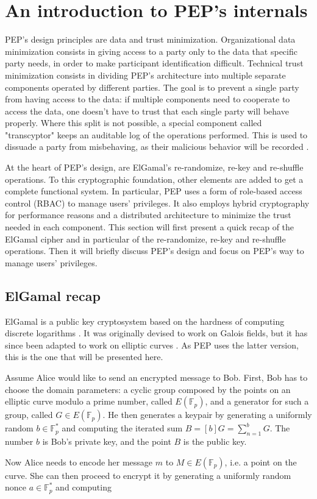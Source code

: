 \documentclass{report}
\begin{document}
\section{An introduction to PEP's internals} 
PEP's design principles are data and trust minimization. Organizational data minimization consists in giving access to a party only to the data that specific party needs, in order to make
participant identification difficult. Technical trust minimization consists in dividing PEP's architecture into multiple separate components operated by different parties. The goal is to
prevent a single party from having access to the data: if multiple components need to cooperate to access the data, one doesn't have to trust that each single party will
behave properly. Where this split is not possible, a special component called "transcyptor" keeps an auditable log of the operations performed. This is used to dissuade a party
from misbehaving, as their malicious behavior will be recorded \cite{pep-blueprint}. \par
At the heart of PEP's design, are ElGamal's re-randomize, re-key and re-shuffle operations. To this cryptographic foundation, other elements are added to get a complete functional system. In
particular, PEP uses a form of role-based access control (RBAC) \cite{rbac} to manage users' privileges. It also employs hybrid cryptography for performance reasons and a
distributed architecture to minimize the trust needed in each component. This section will first present a quick recap of the ElGamal cipher and in particular of the re-randomize, re-key and re-shuffle
operations. Then it will briefly discuss PEP's design and focus on PEP's way to manage users' privileges.

\subsection{ElGamal recap}\label{elgamal_recap}
ElGamal is a public key cryptosystem based on the hardness of computing discrete logarithms \cite{elgamal}. It was originally devised to work on Galois fields, but it has since
been adapted to work on elliptic curves \cite{elliptic-elgamal}. As PEP uses the latter version, this is the one that will be presented here.\par
Assume Alice would like to send an encrypted message to Bob. First, Bob has to choose the domain parameters: a cyclic group composed by the points on an elliptic curve modulo a
prime number, called $E(\mathds{F}_p)$, and a generator for such a group, called $G \in E(\mathds{F}_p)$. He then generates a keypair by generating a uniformly random $b \in
\mathds{F}^*_p$ and computing the iterated sum $B=[b]G=\sum_{n=1}^b G$. The number $b$ is Bob's private key, and the point $B$ is the public key.\par
Now Alice needs to encode her message $m$ to $M \in E(\mathds{F}_p)$, i.e. a point on the curve. She can then proceed to encrypt it by generating a uniformly random nonce $a \in
\mathds{F}^*_p$ and computing
\end{document}
